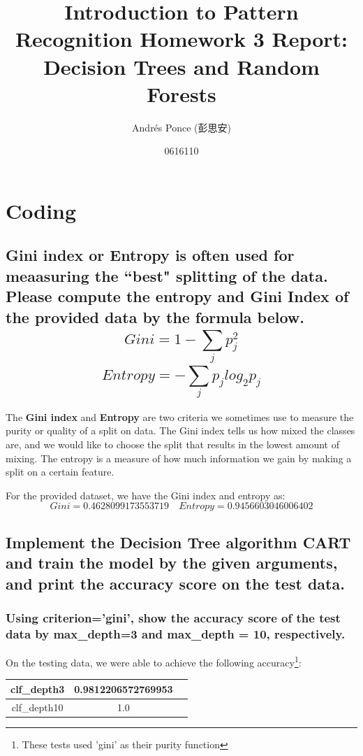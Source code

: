 \documentclass{article}
\title{Introduction to Pattern Recognition Homework 3 Report:
Decision Trees and Random Forests}
\author{Andr\'es Ponce (彭思安)\\
\and
0616110}
\begin{document}
\maketitle


\section{Coding}
	\subsection{Gini index or Entropy is often used for meaasuring the ``best" splitting of the 
		data. Please compute the entropy and Gini Index of the provided data by the formula below.
			\[ Gini = 1 - \sum_{j}^{}p^{2}_{j}\]
			\[ Entropy = -\sum_{j}^{}p_{j}log_{2}p_{j}\]
		}
	The \textbf{Gini index} and \textbf{Entropy} are two criteria we sometimes use to measure the 
	purity or quality of a split on data. The Gini index tells us how mixed the classes are, and 
	we would like to choose the split that results in the lowest amount of mixing. The entropy is
	a measure of how much information we gain by making a split on a certain feature.

	For the provided dataset, we have the Gini index and entropy as:
	\[ Gini = 0.4628099173553719 \quad Entropy = 0.9456603046006402\]

	\subsection{Implement the Decision Tree algorithm CART and train the model by the given arguments,
				and print the accuracy score on the test data.}

		\subsubsection{Using criterion='gini', show the accuracy score of the test data by 
				max\_depth=3 and max\_depth = 10, respectively.}
				On the testing data, we were able to achieve the following accuracy\footnote{These tests used 'gini' as their purity function}:

				\begin{center} 
					\begin{tabular}{|c |c |c |}
						\hline
							clf\_depth3 & 0.9812206572769953\\\hline
							clf\_depth10 & 1.0\\
						\hline
					\end{tabular}
				\end{center}
\end{document}
